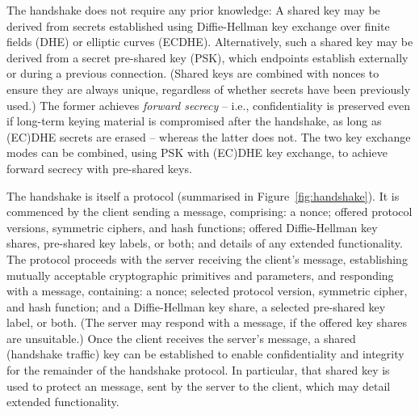 \begin{comment}
Shared keys are established using one of the three supported key exchange 
modes: Ephemeral Diffie-Hellman over finite fields (DHE) or elliptic curves (ECDHE), 
pre-shared key (PSK), or PSK with (EC)DHE. (EC)DHE key exchange requires no prior knowledge, whereas PSK-based key exchanges requires knowledge of a pre-shared key, 
which may have been established out-of-band or during a previous connection. Such a 
pre-shared key also serves to authenticate endpoints, whereas (EC)DHE-only key 
exchange is reliant on asymmetric cryptography for authentication.
\end{comment}
%
%
The handshake does not require any prior knowledge: A shared key may be derived 
from secrets established using Diffie-Hellman key exchange over finite fields (DHE) 
or elliptic curves (ECDHE). Alternatively, %
such a shared key may be derived from a secret pre-shared key (PSK), which %
endpoints
establish %
externally or during a previous connection. (Shared keys 
are combined with nonces to ensure they are always unique, regardless of whether
secrets have been previously used.)
The former achieves \emph{forward secrecy} -- i.e., confidentiality is 
preserved even if long-term keying material is compromised after the handshake, 
as long as (EC)DHE secrets are erased  -- whereas the latter does not.
The two key exchange modes can be combined, using PSK with (EC)DHE key exchange,
to achieve forward secrecy with pre-shared keys. 
%
%

The handshake is itself a protocol (summarised in Figure~\ref{fig:handshake}). 
It is commenced by the client sending a 
\emph{\ClientHello} message, comprising: a nonce; offered protocol versions,  
symmetric ciphers, and hash functions; offered Diffie-Hellman key 
shares, pre-shared key labels, or both; 
and %
details of any extended functionality.
The protocol proceeds with the server receiving the client's 
message, establishing mutually acceptable cryptographic primitives and parameters, 
and responding with a \emph{\ServerHello} message, containing: a nonce; 
selected protocol version, symmetric cipher, and hash function; and
a Diffie-Hellman key share, a selected pre-shared key label, or both. (The server 
may respond with a \emph{\HelloRetryRequest} message, if the offered key shares
are unsuitable.) Once the client receives the server's message, a shared
(handshake traffic) key can be established to enable confidentiality and integrity for the 
remainder of the handshake protocol. In particular, that shared key
is used to protect an \emph{\EncryptedExtensions} message, sent by the server to the 
client, which may detail extended functionality.

